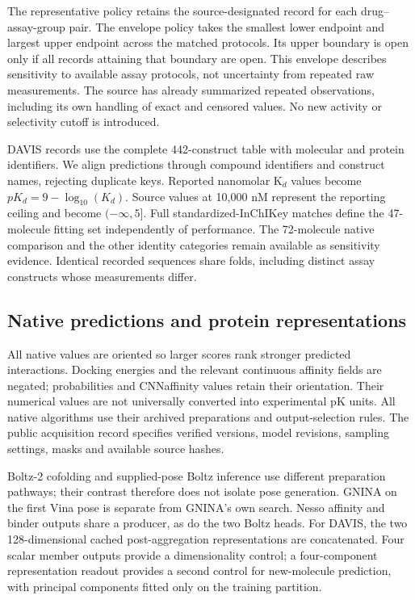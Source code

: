 \documentclass[pdflatex, sn-nature]{sn-jnl}
\begin{document}
The representative policy retains the source-designated record for each drug--assay-group pair. The envelope policy takes the smallest lower endpoint and largest upper endpoint across the matched protocols. Its upper boundary is open only if all records attaining that boundary are open. This envelope describes sensitivity to available assay protocols, not uncertainty from repeated raw measurements. The source has already summarized repeated observations, including its own handling of exact and censored values. No new activity or selectivity cutoff is introduced.

DAVIS records use the complete 442-construct table with molecular and protein identifiers. We align predictions through compound identifiers and construct names, rejecting duplicate keys. Reported nanomolar K$_d$ values become $pK_d=9-\log_{10}(K_d)$. Source values at 10,000 nM represent the reporting ceiling and become $(-\infty, 5]$. Full standardized-InChIKey matches define the 47-molecule fitting set independently of performance. The 72-molecule native comparison and the other identity categories remain available as sensitivity evidence. Identical recorded sequences share folds, including distinct assay constructs whose measurements differ.

\subsection{Native predictions and protein representations}
All native values are oriented so larger scores rank stronger predicted interactions. Docking energies and the relevant continuous affinity fields are negated; probabilities and CNNaffinity values retain their orientation. Their numerical values are not universally converted into experimental pK units. All native algorithms use their archived preparations and output-selection rules. The public acquisition record specifies verified versions, model revisions, sampling settings, masks and available source hashes.

Boltz-2 cofolding and supplied-pose Boltz inference use different preparation pathways; their contrast therefore does not isolate pose generation. GNINA on the first Vina pose is separate from GNINA's own search. Nesso affinity and binder outputs share a producer, as do the two Boltz heads. For DAVIS, the two 128-dimensional cached post-aggregation representations are concatenated. Four scalar member outputs provide a dimensionality control; a four-component representation readout provides a second control for new-molecule prediction, with principal components fitted only on the training partition.
\end{document}
